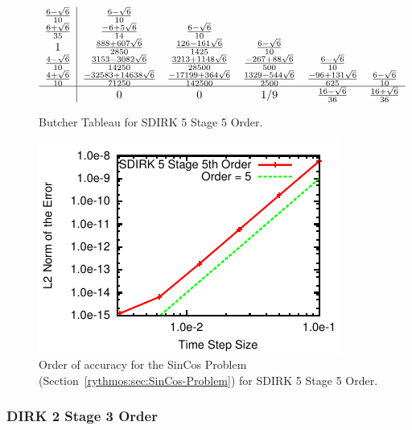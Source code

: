\begin{figure}[H]
\centering{}$\begin{array}{c|ccccc}
\frac{6-\sqrt{6}}{10} & \frac{6-\sqrt{6}}{10}\\
\frac{6+\sqrt{6}}{35} & \frac{-6+5\sqrt{6}}{14} & \frac{6-\sqrt{6}}{10}\\
1 & \frac{888+607\sqrt{6}}{2850} & \frac{126-161\sqrt{6}}{1425} & \frac{6-\sqrt{6}}{10}\\
\frac{4-\sqrt{6}}{10} & \frac{3153-3082\sqrt{6}}{14250} & \frac{3213+1148\sqrt{6}}{28500} & \frac{-267+88\sqrt{6}}{500} & \frac{6-\sqrt{6}}{10}\\
\frac{4+\sqrt{6}}{10} & \frac{-32583+14638\sqrt{6}}{71250} & \frac{-17199+364\sqrt{6}}{142500} & \frac{1329-544\sqrt{6}}{2500} & \frac{-96+131\sqrt{6}}{625} & \frac{6-\sqrt{6}}{10}\\
\hline  & 0 & 0 & 1/9 & \frac{16-\sqrt{6}}{36} & \frac{16+\sqrt{6}}{36}
\end{array}$\caption{Butcher Tableau for SDIRK 5 Stage 5 Order.}
\end{figure}
\begin{figure}[H]
\centering{}\includegraphics[scale=1.5]{figures/SDIRK_5Stage5Order}\caption{Order of accuracy for the SinCos Problem (Section~\ref{rythmos:sec:SinCos-Problem})
for SDIRK 5 Stage 5 Order.}
\end{figure}



\subsubsection{DIRK 2 Stage 3 Order}

